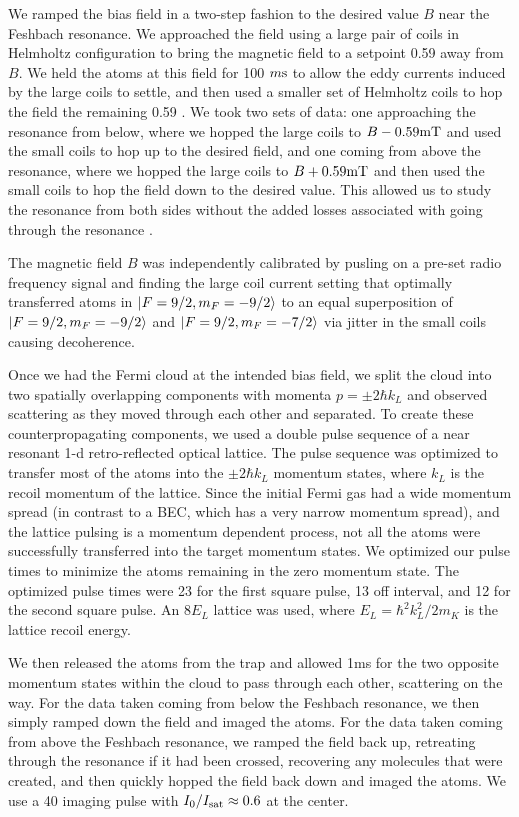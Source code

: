 \documentclass[12pt]{iopart}
\begin{document}
\par We ramped the bias field in a two-step fashion to the desired value $B$ near the Feshbach resonance. We approached the field using a large pair of  coils in Helmholtz configuration to bring the magnetic field to a setpoint 0.59 \mT{} away from $B$. We held the atoms at this field for 100 $m\rm{s}$ to allow the eddy currents induced by the large coils to settle, and then used a smaller set of Helmholtz coils to hop the field the remaining 0.59 \mT{}. We took two sets of data: one approaching the resonance from below, where we hopped the large coils to $B-0.59 \mT{}$ and used the small coils to hop up to the desired field, and one coming from above the resonance, where we hopped the large coils to  $B+0.59  \mT{}$ and then used the small coils to hop the field down to the desired value. This allowed us to study the resonance from both sides without the added losses associated with going through the resonance \cite{Chin10}.
\par The magnetic field $B$ was independently calibrated by pusling on a pre-set radio frequency signal and finding the large coil current setting that optimally transferred \K{} atoms in $\mathinner{|{F=9/2,m_F=-9/2}\rangle}$ to an equal superposition of $\mathinner{|{F=9/2,m_F=-9/2}\rangle}$ and $\mathinner{|{F=9/2,m_F=-7/2}\rangle}$ via jitter in the small coils causing decoherence.
\par Once we had the Fermi cloud at the intended bias field, we split the cloud into two spatially overlapping components with momenta $p=\pm 2\hbar k_L$  and observed scattering as they moved through each other and separated. To create these counterpropagating components, we used a double pulse sequence \cite{Wu05} of a near resonant 1-d retro-reflected optical lattice. The pulse sequence was optimized to transfer most of the atoms into the $\pm 2 \hbar k_L$ momentum states, where $k_L$ is the recoil momentum of the lattice. Since the initial Fermi gas had a wide momentum spread (in contrast to a BEC, which has a very narrow momentum spread), and the lattice pulsing is a momentum dependent process, not all the atoms were successfully transferred into the target momentum states. We optimized our pulse times to minimize the atoms remaining in the zero momentum state. The optimized pulse times were 23 \us{} for the first square pulse, 13 \us{} off interval, and 12 \us{} for the second square pulse. An 8$E_L$ lattice was used, where $E_L=\hbar^2 k_L^2/2m_K$ is the lattice recoil energy.  
\par We then released the atoms from the trap and allowed 1ms for the two opposite momentum states within the cloud to pass through each other, scattering on the way. For the data taken coming from below the Feshbach resonance, we then simply ramped down the field and imaged the atoms. For the data taken coming from above the Feshbach resonance, we ramped the field back up, retreating through the resonance if it had been crossed, recovering any molecules that were created, and then quickly hopped the field back down and imaged the atoms. We use a 40 \us{} imaging pulse with $I_0/I_{\rm{sat}}\approx 0.6$ at the center. 
\end{document}
